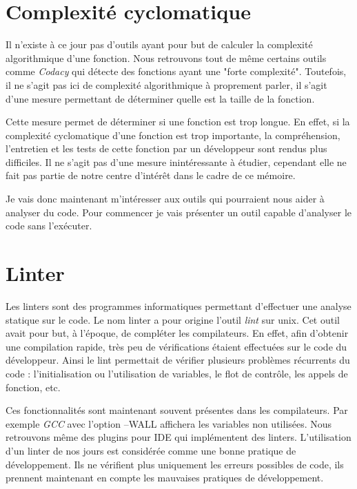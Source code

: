 \documentclass[12pt, twoside, openright]{report}
\begin{document}
\section{Complexité cyclomatique}

Il n'existe à ce jour pas d'outils ayant pour but de calculer la complexité algorithmique d'une fonction. Nous retrouvons tout de même certains outils comme \textit{Codacy} qui détecte des fonctions ayant une "forte complexité". Toutefois, il ne s'agit pas ici de complexité algorithmique à proprement parler, il s'agit d'une mesure permettant de déterminer quelle est la taille de la fonction.

Cette mesure permet de déterminer si une fonction est trop longue. En effet, si la complexité cyclomatique d'une fonction est trop importante, la compréhension, l'entretien et les tests de cette fonction par un développeur sont rendus plus difficiles. Il ne s'agit pas d'une mesure inintéressante à étudier, cependant elle ne fait pas partie de notre centre d'intérêt dans le cadre de ce mémoire.

Je vais donc maintenant m'intéresser aux outils qui pourraient nous aider à analyser du code. Pour commencer je vais présenter un outil capable d'analyser le code sans l'exécuter. 

\section{Linter}
Les linters sont des programmes informatiques permettant d'effectuer une analyse statique sur le code. Le nom linter a pour origine l'outil \textit{lint} sur unix. Cet outil avait pour but, à l'époque, de compléter les compilateurs. En effet, afin d'obtenir une compilation rapide, très peu de vérifications étaient effectuées sur le code du développeur. Ainsi le lint permettait de vérifier plusieurs problèmes récurrents du code : l'initialisation ou l'utilisation de variables, le flot de contrôle, les appels de fonction, etc. \cite{linter01}

Ces fonctionnalités sont maintenant souvent présentes dans les compilateurs. Par exemple \textit{GCC} avec l'option --WALL affichera les variables non utilisées. Nous retrouvons même des plugins pour IDE qui implémentent des linters. L'utilisation d'un linter de nos jours est considérée comme une bonne pratique de développement. Ils ne vérifient plus uniquement les erreurs possibles de code, ils prennent maintenant en compte les mauvaises pratiques de développement.  
\end{document}
